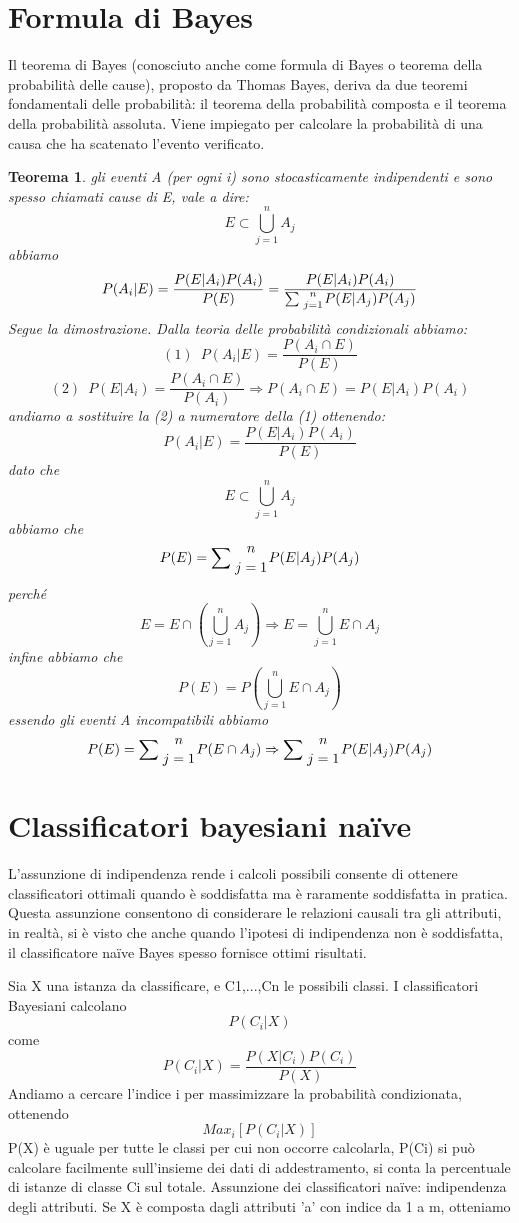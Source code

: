 \documentclass{article}
\theoremstyle{plain}
\newtheorem{thm}{Teorema}[]
\theoremstyle{definition}
\begin{document}
\section{Formula di Bayes}
Il teorema di Bayes (conosciuto anche come formula di Bayes o teorema della probabilità delle cause), proposto da Thomas Bayes, deriva da due teoremi fondamentali delle probabilità: il teorema della probabilità composta e il teorema della probabilità assoluta. Viene impiegato per calcolare la probabilità di una causa che ha scatenato l'evento verificato.\footnotemark
{}
\begin{thm}
	gli eventi A (per ogni i) sono stocasticamente indipendenti e sono spesso chiamati cause di E, vale a dire:
	$$E \subset \bigcup\limits_{j=1}^{n} A_j $$
	abbiamo
	$$P(A_{i}|E)={\frac  {P(E|A_{i})P(A_{i})}{P(E)}}={\frac  {P(E|A_{i})P(A_{i})}
		{\sum {n \atop j=1}P(E|A_{j})P(A_{j})}}$$
Segue la dimostrazione.\footnotemark
Dalla teoria delle probabilità condizionali abbiamo:
$$(1)\,\,\, P(A_i|E)=\frac{P(A_i\cap E)}{P(E)}$$
$$(2)\,\,\, P(E|A_i)=\frac{P(A_i\cap E)}{P(A_i)} \Rightarrow P(A_i\cap E)=P(E|A_i)P(A_i)$$
andiamo a sostituire la (2) a numeratore della (1) ottenendo: 
$$P(A_i|E)=\frac{P(E|A_i)P(A_i)}{P(E)}$$
dato che
$$E \subset \bigcup\limits_{j=1}^{n} A_j $$
abbiamo che
$$P(E)=\sum {n \atop j=1}P(E|A_{j})P(A_{j})$$
perché
$$E=E \cap (\bigcup\limits_{j=1}^{n} A_j) \Rightarrow E=\bigcup\limits_{j=1}^{n} E \cap A_j$$  
infine abbiamo che
$$P(E)=P(\bigcup\limits_{j=1}^{n} E \cap A_j)$$ 
essendo gli eventi A incompatibili abbiamo 
$$P(E)=\sum {n \atop j=1}P(E \cap A_{j}) \Rightarrow 
\sum {n \atop j=1}P(E|A_{j})P(A_{j})$$


\end{thm}
\section{Classificatori bayesiani naïve}
L'assunzione di indipendenza rende i calcoli possibili consente di ottenere classificatori ottimali quando è soddisfatta ma è raramente soddisfatta in pratica.
Questa assunzione consentono di considerare le relazioni causali tra gli attributi, in realtà, si è visto che anche quando l’ipotesi di indipendenza non è soddisfatta, il classificatore naïve Bayes spesso fornisce ottimi risultati.

Sia X una istanza da classificare, e C1,...,Cn le possibili classi. I classificatori Bayesiani calcolano $$P(C_i|X)$$ come $$P(C_i|X)=\frac{P(X|C_i)P(C_i)}{P(X)}$$
Andiamo a cercare l'indice i per massimizzare la probabilità condizionata, ottenendo $$Max_i [P(C_i|X)]$$
P(X) è uguale per tutte le classi per cui non occorre calcolarla, P(Ci) si può calcolare facilmente sull’insieme dei dati di addestramento, si conta la percentuale di istanze di classe Ci sul totale.
Assunzione dei classificatori naïve: indipendenza degli
attributi.
Se X è composta dagli attributi 'a' con indice da 1 a m, otteniamo
\end{document}
